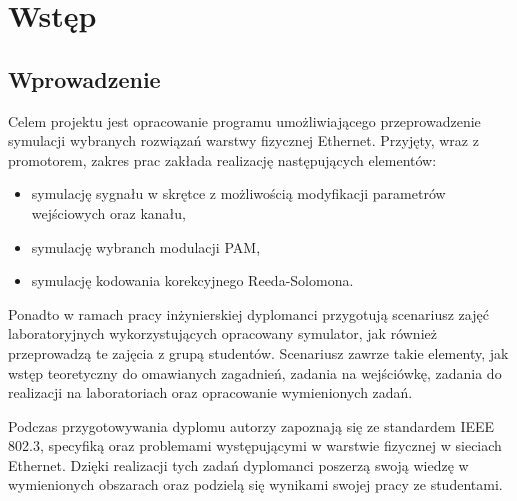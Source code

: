 \section{Wstęp}
\subsection{Wprowadzenie}

Celem projektu jest opracowanie programu umożliwiającego przeprowadzenie symulacji wybranych rozwiązań warstwy fizycznej Ethernet.
Przyjęty, wraz z promotorem, zakres prac zakłada realizację następujących elementów:
\begin{itemize}
    \item symulację sygnału w skrętce z możliwością modyfikacji parametrów wejściowych oraz kanału,
    \item symulację wybranch modulacji PAM,
    \item symulację kodowania korekcyjnego Reeda-Solomona.
\end{itemize}

Ponadto w ramach pracy inżynierskiej dyplomanci przygotują scenariusz zajęć laboratoryjnych wykorzystujących opracowany symulator, jak
również przeprowadzą te zajęcia z grupą studentów. Scenariusz zawrze takie elementy, jak wstęp teoretyczny do omawianych zagadnień,
zadania na wejściówkę, zadania do realizacji na laboratoriach oraz opracowanie wymienionych zadań.

Podczas przygotowywania dyplomu autorzy zapoznają się ze standardem IEEE 802.3, specyfiką oraz problemami występującymi w warstwie fizycznej
w sieciach Ethernet. Dzięki realizacji tych zadań dyplomanci poszerzą swoją wiedzę w wymienionych obszarach oraz podzielą się wynikami
swojej pracy ze studentami.
